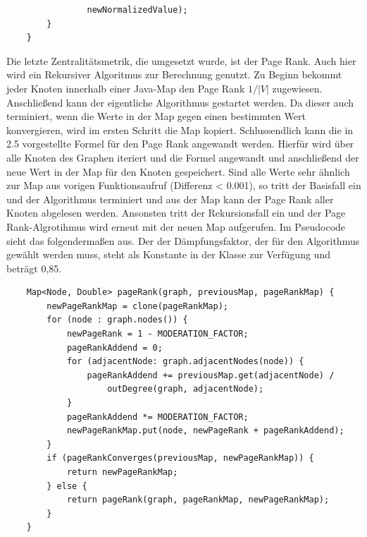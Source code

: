 \documentclass[a4paper,12pt,ngerman,chapterprefix=false,listof=totoc,bibliography=totoc]{scrreprt}
\begin{document}
{{{\begin{lstlisting}
				newNormalizedValue);
		}
	}
\end{lstlisting}
Die letzte Zentralitätsmetrik, die umgesetzt wurde, ist der Page Rank. Auch hier wird ein Rekursiver Algoritmus zur Berechnung genutzt. Zu Beginn bekommt jeder Knoten innerhalb einer Java-Map den Page Rank \(1/|V|\) zugewiesen. Anschließend kann der eigentliche Algorithmus gestartet werden. Da dieser auch terminiert, wenn die Werte in der Map gegen einen bestimmten Wert konvergieren, wird im ersten Schritt die Map kopiert. Schlussendlich kann die in 2.5 vorgestellte Formel für den Page Rank angewandt werden. Hierfür wird über alle Knoten des Graphen iteriert und die Formel angewandt und anschließend der neue Wert in der Map für den Knoten gespeichert. Sind alle Werte sehr ähnlich zur Map aus vorigen Funktionsaufruf (Differenz < 0.001), so tritt der Basisfall ein und der Algorithmus terminiert und aus der Map kann der Page Rank aller Knoten abgelesen werden. Ansonsten tritt der Rekursionsfall ein und der Page Rank-Algrotihmus wird erneut mit der neuen Map aufgerufen. Im Pseudocode sieht das folgendermaßen aus. Der der Dämpfungsfaktor, der für den Algorithmus gewählt werden muss, steht als Konstante in der Klasse zur Verfügung und beträgt 0,85.
\begin{lstlisting}
	Map<Node, Double> pageRank(graph, previousMap, pageRankMap) {
		newPageRankMap = clone(pageRankMap);
		for (node : graph.nodes()) {
			newPageRank = 1 - MODERATION_FACTOR;
			pageRankAddend = 0;
			for (adjacentNode: graph.adjacentNodes(node)) {
				pageRankAddend += previousMap.get(adjacentNode) /
					outDegree(graph, adjacentNode);
			}
			pageRankAddend *= MODERATION_FACTOR;
			newPageRankMap.put(node, newPageRank + pageRankAddend);
		}
		if (pageRankConverges(previousMap, newPageRankMap)) {
			return newPageRankMap;
		} else {
			return pageRank(graph, pageRankMap, newPageRankMap);
		}
	}
\end{lstlisting}
}
}}
\end{document}
